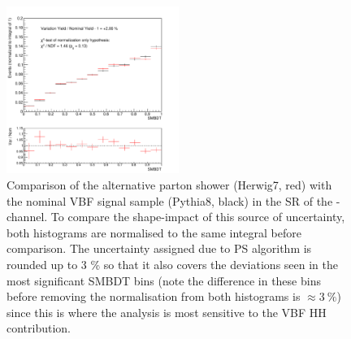 \begin{figure}[htbp]
  \centering

  \includegraphics[width=0.5\textwidth]{figures/systs/hadhad_vbf/ps}

  \caption{Comparison of the alternative parton shower (Herwig7, red)
    with the nominal VBF signal sample (Pythia8, black) in the SR of
    the \hadhad-channel. To compare the shape-impact of this source of
    uncertainty, both histograms are normalised to the same integral
    before comparison. The uncertainty assigned due to PS algorithm is
    rounded up to 3 \% so that it also covers the deviations seen in
    the most significant SMBDT bins (note the difference in these bins
    before removing the normalisation from both histograms is
    $\approx \SI{3}{\percent}$) since this is where the analysis is
    most sensitive to the VBF HH contribution.}
\label{fig:vbf_uncertainties_ps}
\end{figure}

